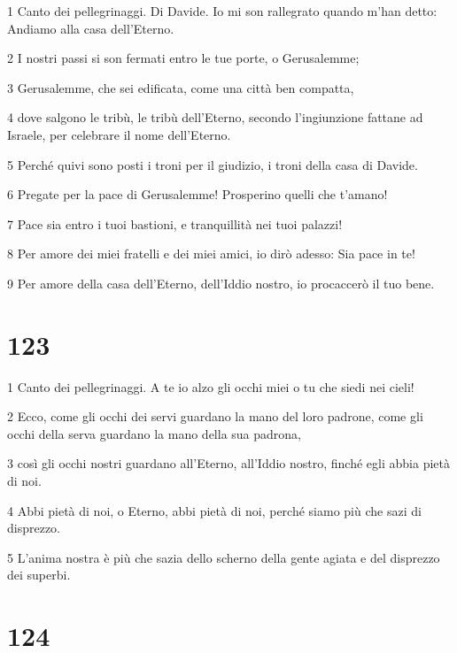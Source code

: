 \par 1 Canto dei pellegrinaggi. Di Davide. Io mi son rallegrato quando m'han detto: Andiamo alla casa dell'Eterno.
\par 2 I nostri passi si son fermati entro le tue porte, o Gerusalemme;
\par 3 Gerusalemme, che sei edificata, come una città ben compatta,
\par 4 dove salgono le tribù, le tribù dell'Eterno, secondo l'ingiunzione fattane ad Israele, per celebrare il nome dell'Eterno.
\par 5 Perché quivi sono posti i troni per il giudizio, i troni della casa di Davide.
\par 6 Pregate per la pace di Gerusalemme! Prosperino quelli che t'amano!
\par 7 Pace sia entro i tuoi bastioni, e tranquillità nei tuoi palazzi!
\par 8 Per amore dei miei fratelli e dei miei amici, io dirò adesso: Sia pace in te!
\par 9 Per amore della casa dell'Eterno, dell'Iddio nostro, io procaccerò il tuo bene.

\chapter{123}

\par 1 Canto dei pellegrinaggi. A te io alzo gli occhi miei o tu che siedi nei cieli!
\par 2 Ecco, come gli occhi dei servi guardano la mano del loro padrone, come gli occhi della serva guardano la mano della sua padrona,
\par 3 così gli occhi nostri guardano all'Eterno, all'Iddio nostro, finché egli abbia pietà di noi.
\par 4 Abbi pietà di noi, o Eterno, abbi pietà di noi, perché siamo più che sazi di disprezzo.
\par 5 L'anima nostra è più che sazia dello scherno della gente agiata e del disprezzo dei superbi.

\chapter{124}

